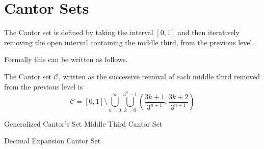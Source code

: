 \section{Cantor Sets}
The Cantor set is defined by taking the interval $[0,1]$ and then iteratively removing the open interval containing the middle third, from the previous level.  

Formally this can be written as follows.
\begin{definition}
    The Cantor set $\mathcal{C}$, written as the successive removal of each middle third removed from the previous level is 
    $$\mathcal{C} = [0,1] \setminus \bigcup_{n=0}^\infty\bigcup_{k=0}^{3^n-1}\left(\frac{3k+1}{3^{n+1}},\frac{3k+2}{3^{n+1}}\right)$$
\end{definition}

\begin{definition}{Generalized Cantor's Set}
    Middle Third Cantor Set
\end{definition}

\begin{example}{Decimal Expansion Cantor Set}
    
\end{example}
